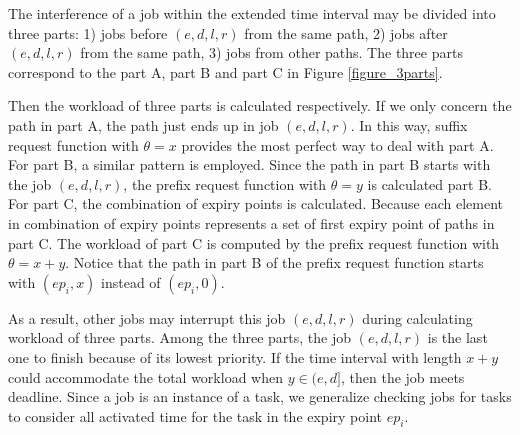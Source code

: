 \documentclass[10pt,conference]{IEEEtran}
\begin{document}
The interference of a job within the extended time interval may be divided into three parts: 1) jobs before $(e,d,l,r)$ from the same path, 2) jobs after $(e,d,l,r)$ from the same path, 3) jobs from other paths. The three parts correspond to the part A, part B and part C in Figure \ref{figure_3parts}. 

Then the workload of three parts is calculated respectively. If we only concern the path in part A, the path just ends up in job $(e,d,l,r)$. In this way, suffix request function with $\theta=x$ provides the most perfect way to deal with part A. For part B, a similar pattern is employed. Since the path in part B starts with the job $(e,d,l,r)$, the prefix request function with $\theta=y$ is calculated part B. For part C, the combination of expiry points is calculated. Because each element in combination of expiry points represents a set of first expiry point of paths in part C. The workload of part C is computed by the prefix request function with $\theta=x+y$. Notice that the path in part B of the prefix request function starts with $(ep_i,x)$ instead of $(ep_i,0)$.

As a result, other jobs may interrupt this job $(e,d,l,r)$ during calculating workload of three parts. Among the three parts, the job $(e,d,l,r)$ is the last one to finish because of its lowest priority. If the time interval with length $x+y$ could accommodate the total workload when $y\in(e,d]$, then the job meets deadline. Since a job is an instance of a task, we generalize checking jobs for tasks to consider all activated time for the task in the expiry point $ep_i$. 
\end{document}
